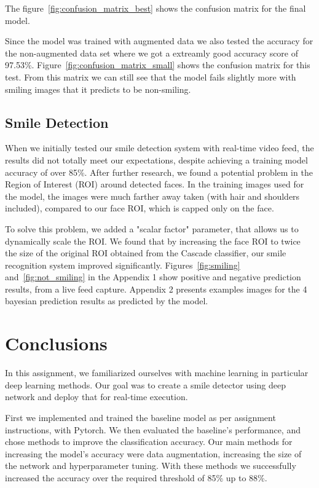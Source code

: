 \documentclass[12pt,a4paper,english
]{tunithesis}
\begin{document}
The figure~\ref{fig:confusion_matrix_best} shows the confusion matrix for the final model.

Since the model was trained with augmented data we also tested the accuracy for the non-augmented data set where we got a extreamly good accuracy score of 97.53\%. Figure~\ref{fig:confusion_matrix_small} shows the confusion matrix for this test. From this matrix we can still see that the model fails slightly more with smiling images that it predicts to be non-smiling.

\section{Smile Detection}
When we initially tested our smile detection system with real-time video feed, the results did not totally meet our expectations, despite achieving a training model accuracy of over 85\%. After further research, we found a potential problem in the Region of Interest (ROI) around detected faces. In the training images used for the model, the images were much farther away taken (with hair and shoulders included), compared to our face ROI, which is capped only on the face.  

To solve this problem, we added a "scalar factor" parameter, that allows us to dynamically scale the ROI. We found that by increasing the face ROI to twice the size of the original ROI obtained from the Cascade classifier, our smile recognition system improved significantly. Figures~\ref{fig:smiling} and~\ref{fig:not_smiling} in the Appendix 1 show positive and negative prediction results, from a live feed capture. Appendix 2 presents examples images for the 4 bayesian prediction results as predicted by the model.


\chapter{Conclusions}
\label{ch:conclusions}

In this assignment, we familiarized ourselves with machine learning in particular deep learning methods. Our goal was to create a smile detector using deep network and deploy that for real-time execution. 

First we implemented and trained the baseline model as per assignment instructions, with Pytorch. We then evaluated the baseline's performance, and chose methods to improve the classification accuracy. Our main methods for increasing the model's accuracy were data augmentation, increasing the size of the network and hyperparameter tuning. With these methods we successfully increased the accuracy over the required threshold of 85\% up to 88\%.
\end{document}
